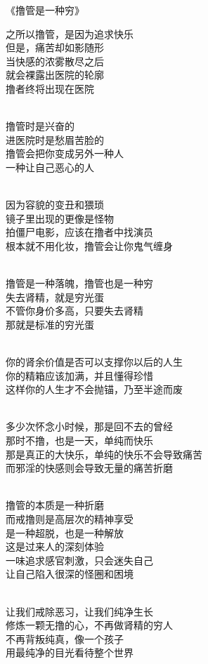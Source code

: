 \begin{center}
    《撸管是一种穷》\it
    \begin{multicols}{2}
        之所以撸管，是因为追求快乐 \\ 但是，痛苦却如影随形 \\ 当快感的浓雾散尽之后 \\ 就会裸露出医院的轮廓 \\ 撸者终将出现在医院

        ~\\

        撸管时是兴奋的 \\ 进医院时是愁眉苦脸的 \\ 撸管会把你变成另外一种人 \\ 一种让自己恶心的人

        ~\\

        因为容貌的变丑和猥琐 \\ 镜子里出现的更像是怪物 \\ 拍僵尸电影，应该在撸者中找演员 \\ 根本就不用化妆，撸管会让你鬼气缠身

        ~\\

        撸管是一种落魄，撸管也是一种穷 \\ 失去肾精，就是穷光蛋 \\ 不管你身价多高，只要失去肾精 \\ 那就是标准的穷光蛋

        ~\\

        你的肾余价值是否可以支撑你以后的人生 \\ 你的精箱应该加满，并且懂得珍惜 \\ 这样你的人生才不会抛锚，乃至半途而废

        ~\\

        多少次怀念小时候，那是回不去的曾经 \\ 那时不撸，也是一天，单纯而快乐 \\ 那是真正的大快乐，单纯的快乐不会导致痛苦 \\ 而邪淫的快感则会导致无量的痛苦折磨

        ~\\

        撸管的本质是一种折磨 \\ 而戒撸则是高层次的精神享受 \\ 是一种超脱，也是一种解放 \\ 这是过来人的深刻体验 \\ 一味追求感官刺激，只会迷失自己 \\ 让自己陷入很深的怪圈和困境

        ~\\

        让我们戒除恶习，让我们纯净生长 \\ 修炼一颗无撸的心，不再做肾精的穷人 \\ 不再背叛纯真，像一个孩子 \\ 用最纯净的目光看待整个世界
    \end{multicols}
\end{center}

